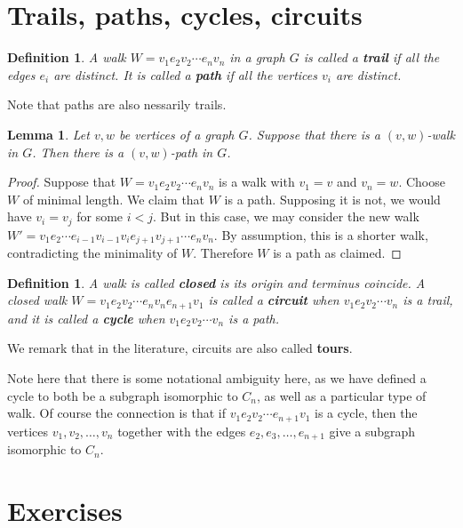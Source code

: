 \documentclass[12pt]{report}
\theoremstyle{plain}
\newtheorem{defn}[thm]{Definition}
\newtheorem{lem}[thm]{Lemma}
\newcommand{\Xb}[1]{\textbf{#1}\index{#1}}
\begin{document}
\section{Trails, paths, cycles, circuits}

\begin{defn}
A walk $W = v_1 e_2 v_2 \cdots e_n v_n$ in a graph $G$ is called a
\Xb{trail} if all the edges $e_i$ are distinct. It is called a \Xb{path} if
all the vertices $v_i$ are distinct.
\end{defn}
Note that paths are also nessarily trails.

\begin{lem}
Let $v, w$ be vertices of a graph $G$. Suppose that there is a $(v,w)$-walk
in $G$. Then there is a $(v,w)$-path in $G$.
\end{lem}
\begin{proof}
Suppose that $W = v_1 e_2 v_2 \cdots e_n v_n$ is a walk with $v_1 = v$ and
$v_n = w$. Choose $W$ of minimal length. We claim that $W$ is a path.
Supposing it is not, we would have $v_i = v_j$ for some $i < j$. But in
this case, we may consider the new walk $W' = v_1 e_2 \cdots e_{i-1}
v_{i-1} v_i e_{j+1} v_{j+1} \cdots e_n v_n$. By assumption, this is a
shorter walk, contradicting the minimality of $W$. Therefore $W$ is a path
as claimed.
\end{proof}

\begin{defn}
A walk is called \textbf{closed} is its origin and
terminus coincide. A closed walk $W = v_1 e_2 v_2 \cdots e_n v_n e_{n+1}
v_1$ is called a \Xb{circuit} when $v_1 e_2 v_2 \cdots v_n$ is a trail,
and it is called a \Xb{cycle} when $v_1 e_2 v_2 \cdots v_n$ is a path.
\end{defn}

We remark that in the literature, circuits are also called \Xb{tours}.

Note here that there is some notational ambiguity here, as we have defined
a cycle to both be a subgraph isomorphic to $C_n$, as well as a particular
type of walk. Of course the connection is that if $v_1 e_2 v_2 \cdots
e_{n+1} v_1$ is a cycle, then the vertices $v_1, v_2, \ldots, v_n$
together with the edges $e_2, e_3, \ldots, e_{n+1}$ give a subgraph isomorphic
to $C_n$.

\section{Exercises}
\end{document}
